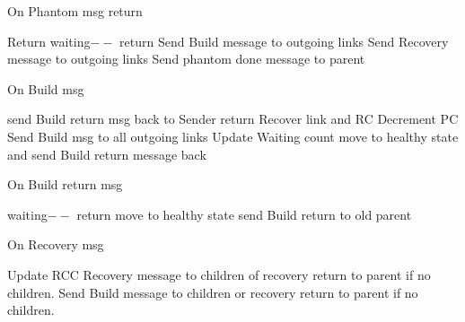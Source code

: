 \documentclass{article}
\begin{document}
	
\begin{algorithm}
\caption{On Phantom msg return}
\label{Phantom Done message received}
\begin{algorithmic}[1]
\State Return
\EndIf
\State waiting$--$
\State return
\EndIf
{}
\State Send Build message to outgoing links
\State Send Recovery message to outgoing links
\Else
\State Send phantom done message to parent
\EndIf
\EndProcedure
\end{algorithmic}
\end{algorithm}	


	
\begin{algorithm}
\caption{On Build msg}
\label{Build message received}
\begin{algorithmic}[1]
\State send Build return msg back to Sender
\State return
\EndIf
\State Recover link and RC
\State Decrement PC
\State Send Build msg to all outgoing links
\State Update Waiting count
\State move to healthy state and send Build return message back
\EndIf
\EndProcedure
\end{algorithmic}
\end{algorithm}	



\begin{algorithm}
\caption{On Build return msg}
\label{Build return message received}
\begin{algorithmic}[1]
\State waiting$--$
\State return
\EndIf
\State move to healthy state
\State send Build return to old parent
\EndIf
\EndProcedure
\end{algorithmic}
\end{algorithm}	


\begin{algorithm}
\caption{On Recovery msg}
\label{Recovery message received}
\begin{algorithmic}[1]
\State Update RCC
\State Recovery message to children of recovery return to parent if no children.
\EndIf
{} 
\State Send Build message to children or recovery return to parent if no children.
\EndIf
\EndProcedure
\end{algorithmic}
\end{algorithm}	
\end{document}
